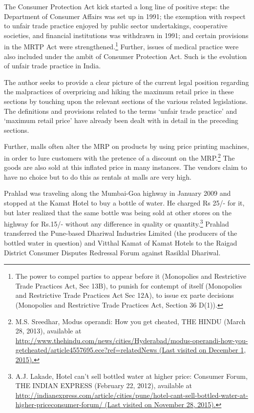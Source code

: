 \begin{multicols}{2}
\vspace{-.1cm}

\noi
The Consumer Protection Act kick started a long line of positive steps: the Department of
Consumer Affairs was set up in 1991; the exemption with respect to unfair trade practice
enjoyed by public sector undertakings, cooperative societies, and financial institutions was
withdrawn in 1991; and certain provisions in the MRTP Act were strengthened.\footnote{The power to compel parties to appear before it (Monopolies and Restrictive Trade Practices Act, Sec 13B),
to punish for contempt of itself (Monopolies and Restrictive Trade Practices Act Sec 12A), to issue ex parte decisions (Monopolies and Restrictive Trade Practices Act, Section 36 D(1)).} Further, issues of medical practice were also included under the ambit of Consumer Protection Act.
Such is the evolution of unfair trade practice in India.


\noi
The author seeks to provide a clear picture of the current legal position regarding the
malpractices of overpricing and hiking the maximum retail price in these sections by touching
upon the relevant sections of the various related legislations. The definitions and provisions
related to the terms ‘unfair trade practice’ and ‘maximum retail price’ have already been dealt
with in detail in the preceding sections.

\noi
Further, malls often alter the MRP on products by using price printing machines, in order to
lure customers with the pretence of a discount on the MRP.\footnote{M.S. Sreedhar, Modus operandi: How you get cheated, THE HINDU (March 28, 2013), available at\\  \url{http://www.thehindu.com/news/cities/Hyderabad/modus-operandi-how-you-getcheated/article4557695.ece?ref=relatedNews (Last visited on December 1, 2015).}} The goods are also sold at this
inflated price in many instances. The vendors claim to have no choice but to do this as rentals
at malls are very high.

\noi
Prahlad was traveling along the Mumbai-Goa highway in January 2009 and stopped at the
Kamat Hotel to buy a bottle of water. He charged Rs 25/- for it, but later realized that the same
bottle was being sold at other stores on the highway for Rs.15/- without any difference in
quality or quantity.\footnote{ A.J. Lakade, Hotel can’t sell bottled water at higher price: Consumer Forum, THE INDIAN EXPRESS (February 22, 2012), available at \url{http://indianexpress.com/article/cities/pune/hotel-cant-sell-bottled-water-at-higher-priceconsumer-forum/ (Last visited on November 28, 2015).}} Prahlad transferred the Pune-based Dhariwal Industries Limited (the producers of the bottled water in question) and Vitthal Kamat of Kamat Hotels to the Raigad
District Consumer Disputes Redressal Forum against Rasiklal Dhariwal.


\end{multicols}
